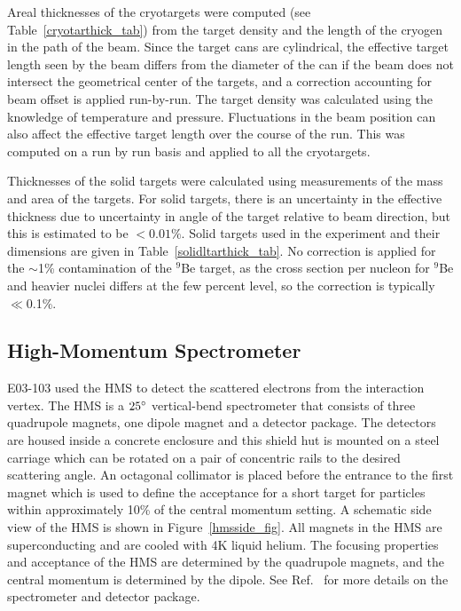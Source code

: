 Areal thicknesses of the cryotargets were computed (see
Table~\ref{cryotarthick_tab}) from the target density and the length of the
cryogen in the path of the beam. Since the target cans are cylindrical, the
effective target length seen by the beam differs from the diameter of the can
if the beam does not intersect the geometrical center of the targets, and a
correction accounting for beam offset is applied run-by-run. The target
density was calculated using the knowledge of temperature and pressure.
Fluctuations in the beam position can also affect the effective target length
over the course of the run. This was computed on a run by run basis and
applied to all the cryotargets.

Thicknesses of the solid targets were calculated using measurements of the
mass and area of the targets. For solid targets, there is an uncertainty in
the effective thickness due to uncertainty in angle of the target relative to
beam direction, but this is estimated to be $<0.01\%$. Solid targets used in
the experiment and their dimensions are given in
Table~\ref{solidltarthick_tab}.  No correction is applied for the $\sim$1\%
contamination of the $^9$Be target, as the cross section per nucleon for $^9$Be
and heavier nuclei differs at the few percent level, so the correction is
typically $\ll$0.1\%.


\subsection{High-Momentum Spectrometer}\label{hms.ssec}

E03-103 used the HMS to detect the scattered electrons from the interaction
vertex. The HMS is a $25^\circ$ vertical-bend spectrometer that consists of
three quadrupole magnets, one dipole magnet and a detector package. The
detectors are housed inside a concrete enclosure and this shield hut is
mounted on a steel carriage which can be rotated on a pair of concentric rails
to the desired scattering angle.  An octagonal collimator is placed before the
entrance to the first magnet which is used to define the acceptance for a
short target for particles within approximately 10\% of the central momentum
setting. A schematic side view of the HMS is shown in
Figure~\ref{hmsside_fig}. All magnets in the HMS are superconducting and are
cooled with 4K liquid helium. The focusing properties and acceptance of the
HMS are determined by the quadrupole magnets, and the central momentum is
determined by the dipole. See Ref.~\cite{johna_thesis, Dutta:2003yt} for more
details on the spectrometer and detector package.

